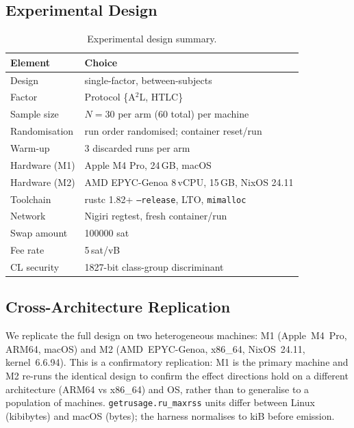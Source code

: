 \documentclass[sigconf,nonacm]{acmart}
\newcommand{\code}[1]{\texttt{\small #1}}
\begin{document}
\subsection{Experimental Design}
\begin{table}[t]
	\small
	\caption{Experimental design summary.}
	\label{tab:design}
	\begin{tabular}{@{}ll@{}}
		\toprule
		Element       & Choice                                             \\
		\midrule
		Design        & single-factor, between-subjects                    \\
		Factor        & Protocol \{A$^2$L, HTLC\}                          \\
		Sample size   & $N=30$ per arm (60 total) per machine              \\
		Randomisation & run order randomised; container reset/run          \\
		Warm-up       & 3 discarded runs per arm                           \\
		Hardware (M1) & Apple M4 Pro, 24\,GB, macOS                        \\
		Hardware (M2) & AMD EPYC-Genoa 8\,vCPU, 15\,GB, NixOS 24.11        \\
		Toolchain     & rustc 1.82+ \code{--release}, LTO, \code{mimalloc} \\
		Network       & Nigiri regtest, fresh container/run                \\
		Swap amount   & \num{100000} sat                                   \\
		Fee rate      & 5\,sat/vB                                 \\
		CL security   & \num{1827}-bit class-group discriminant            \\
		\bottomrule
	\end{tabular}
\end{table}

\subsection{Cross-Architecture Replication}
We replicate the full design on two heterogeneous machines: M1 (Apple~M4~Pro,
ARM64, macOS) and M2 (AMD~EPYC-Genoa, x86\_64, NixOS~24.11, kernel~6.6.94).
This is a confirmatory replication: M1 is the primary machine and M2
re-runs the identical design to confirm the effect directions hold on a
different architecture (ARM64 vs x86\_64) and OS, rather than to generalise
to a population of machines. \code{getrusage.ru\_maxrss} units differ
between Linux (kibibytes) and macOS (bytes); the harness normalises to kiB
before emission.
\end{document}
